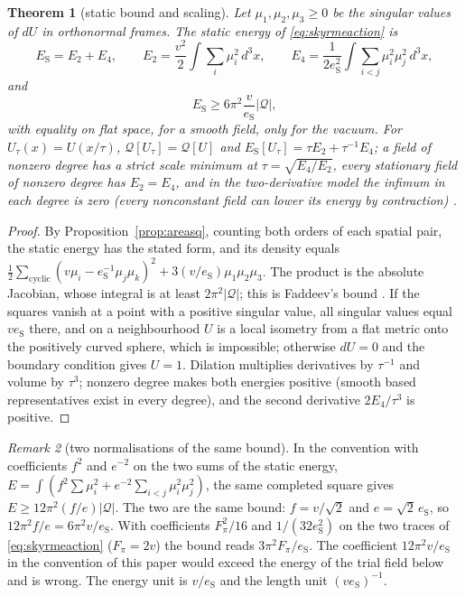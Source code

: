 \documentclass[aps,pra,onecolumn,superscriptaddress,nofootinbib,10pt]{revtex4-2}
\newtheorem{theorem}{Theorem}
\theoremstyle{definition}
\theoremstyle{remark}
\newtheorem{remark}[theorem]{Remark}
\begin{document}
\begin{theorem}[static bound and scaling]\label{thm:skbound}
Let $\mu_1,\mu_2,\mu_3\ge0$ be the singular values of $dU$ in orthonormal frames.  The static energy of
\eqref{eq:skyrmeaction} is
\[
E_{\mathrm S}=E_2+E_4,\qquad E_2=\frac{v^2}2\int\sum_i\mu_i^2\,d^3x,\qquad E_4=\frac1{2e_{\mathrm S}^2}\int\sum_{i<j}\mu_i^2\mu_j^2\,d^3x,
\]
and
\begin{equation}\label{eq:skbound}
E_{\mathrm S}\ge6\pi^2\frac v{e_{\mathrm S}}\lvert\mathcal Q\rvert ,
\end{equation}
with equality on flat space, for a smooth field, only for the vacuum.  For $U_\tau(x)=U(x/\tau)$, $\mathcal Q[U_\tau]=\mathcal Q[U]$ and
$E_{\mathrm S}[U_\tau]=\tau E_2+\tau^{-1}E_4$; a field of nonzero degree has a strict scale minimum at $\tau=\sqrt{E_4/E_2}$, every
stationary field of nonzero degree has $E_2=E_4$, and in the two-derivative model the infimum in each degree is
zero (every nonconstant field can lower its energy by contraction) \cite{n6:derrick}.
\end{theorem}
\begin{proof}
By Proposition~\ref{prop:areasq}, counting both orders of each spatial pair, the static energy has the stated form,
and its density equals $\tfrac12\sum_{\mathrm{cyclic}}(v\mu_i-e_{\mathrm S}^{-1}\mu_j\mu_k)^2+3(v/e_{\mathrm S})\mu_1\mu_2\mu_3$.  The product is the absolute
Jacobian, whose integral is at least $2\pi^2\lvert\mathcal Q\rvert$; this is Faddeev's bound \cite{n6:faddeev}.  If the squares vanish at a
point with a positive singular value, all singular values equal $ve_{\mathrm S}$ there, and on a neighbourhood $U$ is a local
isometry from a flat metric onto the positively curved sphere, which is impossible; otherwise $dU=0$ and the
boundary condition gives $U=1$.  Dilation multiplies derivatives by $\tau^{-1}$ and volume by $\tau^3$; nonzero degree
makes both energies positive (smooth based representatives exist in every degree), and the second
derivative $2E_4/\tau^3$ is positive.
\end{proof}

\begin{remark}[two normalisations of the same bound]\label{rem:sknorm}
In the convention with coefficients $f^2$ and $e^{-2}$ on the two sums of the static energy,
$E=\int(f^2\sum\mu_i^2+e^{-2}\sum_{i<j}\mu_i^2\mu_j^2)$, the same completed square gives $E\ge12\pi^2(f/e)\lvert\mathcal Q\rvert$.  The two are the same
bound: $f=v/\sqrt2$ and $e=\sqrt2\,e_{\mathrm S}$, so $12\pi^2f/e=6\pi^2v/e_{\mathrm S}$.  With coefficients $F_\pi^2/16$ and $1/(32e_{\mathrm S}^2)$ on the two
traces of \eqref{eq:skyrmeaction} ($F_\pi=2v$) the bound reads $3\pi^2F_\pi/e_{\mathrm S}$.  The coefficient $12\pi^2v/e_{\mathrm S}$ in the convention of
this paper would exceed the energy of the trial field below and is wrong.  The energy unit is $v/e_{\mathrm S}$ and
the length unit $(ve_{\mathrm S})^{-1}$.
\end{remark}
\end{document}
